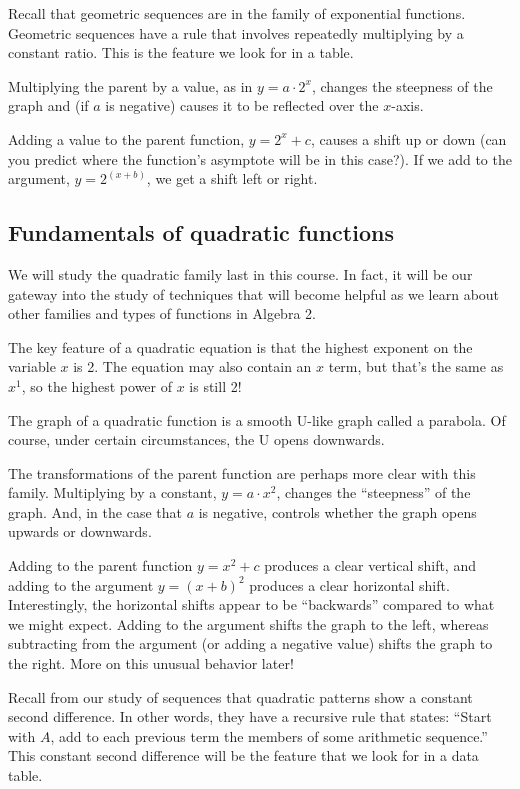 Recall that geometric sequences are in the family of exponential functions. Geometric sequences have a rule that involves repeatedly multiplying by a constant ratio. This is the feature we look for in a table.

Multiplying the parent by a value, as in $y=a\cdot2^x$, changes the steepness of the graph and (if $a$ is negative) causes it to be reflected over the $x$-axis.

Adding a value to the parent function, $y=2^x+c$, causes a shift up or down (can you predict where the function's asymptote will be in this case?). If we add to the argument, $y = 2^{(x+b)}$, we get a shift left or right.


\subsection{Fundamentals of quadratic functions}

We will study the quadratic family last in this course. In fact, it will be our gateway into the study of techniques that will become helpful as we learn about other families and types of functions in Algebra 2.

The key feature of a quadratic equation is that the highest exponent on the variable $x$ is 2. The equation may also contain an $x$ term, but that's the same as $x^1$, so the highest power of $x$ is still 2!

The graph of a quadratic function is a smooth U-like graph called a \gls{parabola}. Of course, under certain circumstances, the U opens downwards.

The transformations of the parent function are perhaps more clear with this family. Multiplying by a constant, $y=a \cdot x^2$, changes the ``steepness'' of the graph. And, in the case that $a$ is negative, controls whether the graph opens upwards or downwards.

Adding to the parent function $y=x^2+c$ produces a clear vertical shift, and adding to the argument $y=(x+b)^2$ produces a clear horizontal shift. Interestingly, the horizontal shifts appear to be ``backwards'' compared to what we might expect. Adding to the argument shifts the graph to the left, whereas subtracting from the argument (or adding a negative value) shifts the graph to the right. More on this unusual behavior later!

Recall from our study of sequences that quadratic patterns show a constant second difference. In other words, they have a recursive rule that states: ``Start with $A$, add to each previous term the members of some arithmetic sequence.'' This constant second difference will be the feature that we look for in a data table.


